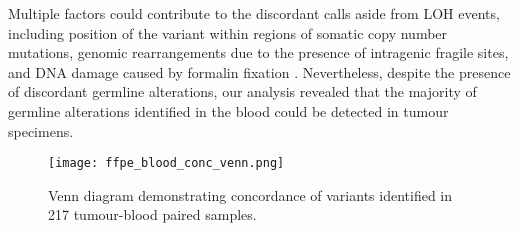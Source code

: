 Multiple factors could contribute to the discordant calls aside from LOH events, including position of the variant within regions of somatic copy number mutations, genomic rearrangements due to the presence of intragenic fragile sites, and DNA damage caused by formalin fixation \cite{Gross2013, Arlt2004}. Nevertheless, despite the presence of discordant germline alterations, our analysis revealed that the majority of germline alterations identified in the blood could be detected in tumour specimens.


\begin{figure}[H]
\centering
	\texttt{[image: ffpe\_blood\_conc\_venn.png]}
	\caption{Venn diagram demonstrating concordance of variants identified in 217 tumour-blood paired samples.}
	\label{fig:ffpe_blood_conc_venn}
\end{figure}


